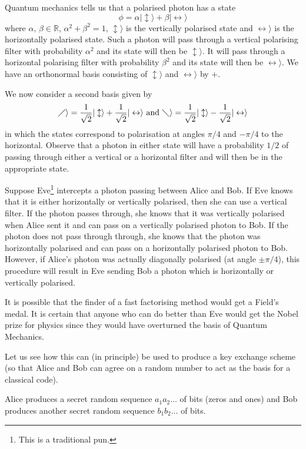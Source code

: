 Quantum mechanics tells us that a polarised photon
has a state
\[\phi=\alpha|\updownarrow\rangle+
\beta|\leftrightarrow\rangle\]
where $\alpha,\,\beta\in{\mathbb R}$,
$\alpha^{2}+\beta^{2}=1$, 
$\updownarrow\rangle$ is the vertically polarised
state and $\leftrightarrow\rangle$ is the
horizontally polarised state. Such a photon
will pass through a vertical polarising filter
with probability $\alpha^{2}$ 
and its state will then be $\updownarrow\rangle$.
It will pass through a horizontal polarising
filter with probability $\beta^{2}$ 
and its state will then be $\leftrightarrow\rangle$.
We have an orthonormal basis consisting of
$\updownarrow\rangle$
and $\leftrightarrow\rangle$ by $+$.

We now consider a second basis given
by
\[\diagup\rangle=\frac{1}{\sqrt 2}|\updownarrow\rangle+
\frac{1}{\sqrt 2}|\leftrightarrow\rangle
\ \text{and}
\ \diagdown\rangle=\frac{1}{\sqrt 2}|\updownarrow\rangle
-\frac{1}{\sqrt 2}|\leftrightarrow\rangle\]
in which the states correspond to polarisation
at angles $\pi/4$ and $-\pi/4$ to the horizontal.
Observe that a photon in either state
will have a probability $1/2$ of passing through
either a vertical or a horizontal filter
and  will then be in the appropriate state.

Suppose Eve\footnote{This is a traditional pun.}
intercepts a photon passing between Alice and Bob.
If Eve knows that it is either horizontally
or vertically polarised, then she can use a vertical
filter. If the photon passes through, she knows that
it was vertically polarised when Alice sent it
and can pass on a vertically polarised photon to Bob.
If the photon does not pass through through, she knows that
the photon was horizontally polarised
and can pass on a horizontally polarised photon to Bob.
However, if Alice's photon was actually diagonally
polarised (at angle $\pm\pi/4$), this procedure
will result in Eve sending Bob a photon which is
horizontally or vertically polarised.

It is possible that the finder of a fast factorising
method would get a Field's medal. It is certain that
anyone who can do better than Eve would get the Nobel 
prize for physics since they would have overturned
the basis of Quantum Mechanics.

Let us see how this can (in principle) be used
to produce a key exchange scheme
(so that Alice and Bob can agree on a random number
to act as the basis for a classical code).

 Alice produces a secret
random sequence $a_{1}a_{2}\dots$ of bits (zeros and ones)
and Bob produces another secret
random sequence $b_{1}b_{2}\dots$ of bits.

